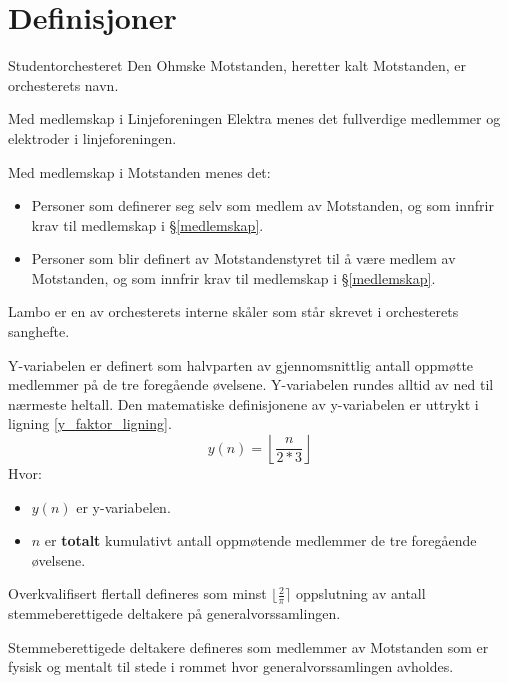 \section{Definisjoner}

\begin{definition}
    Studentorchesteret Den Ohmske Motstanden, heretter kalt Motstanden, er orchesterets navn.
\end{definition}

\begin{definition}
    Med medlemskap i Linjeforeningen Elektra menes det fullverdige medlemmer og elektroder i linjeforeningen.
\end{definition}

\begin{definition}
    Med medlemskap i Motstanden menes det: 
    \begin{itemize}
        \item Personer som definerer seg selv som medlem av Motstanden, og som innfrir krav til medlemskap i
        \S\hspace{3pt}\ref{medlemskap}.
        \item Personer som blir definert av Motstandenstyret til å være medlem av Motstanden, og som innfrir krav til medlemskap i \S\hspace{3pt}\ref{medlemskap}.
    \end{itemize}
\end{definition}

\begin{definition}
    Lambo er en av orchesterets interne skåler som står skrevet i orchesterets sanghefte.
\end{definition}

\begin{definition}[\label{y_faktor_paragraf}]
    Y-variabelen er definert som halvparten av gjennomsnittlig antall oppmøtte medlemmer på de tre foregående øvelsene. Y-variabelen rundes alltid av ned til nærmeste heltall. Den matematiske definisjonene av y-variabelen er uttrykt i ligning \ref{y_faktor_ligning}.
    \begin{equation}\label{y_faktor_ligning}
        y(n) = \left\lfloor \frac{n}{2*3} \right\rfloor
    \end{equation}
    Hvor:
    \begin{itemize}
        \item $y(n)$ er y-variabelen.
        \item $n$ er \textbf{totalt} kumulativt antall oppmøtende medlemmer de tre foregående øvelsene. 
    \end{itemize}
\end{definition}

\begin{definition}[\label{overkvalifisert_flertall}]
    Overkvalifisert flertall defineres som minst $\lfloor\frac{2}{\pi}\rceil$ oppslutning av antall stemmeberettigede deltakere på generalvorssamlingen.
\end{definition}

\begin{definition}
    Stemmeberettigede deltakere defineres som medlemmer av Motstanden som er fysisk og mentalt til stede i rommet hvor generalvorssamlingen avholdes.
\end{definition}
